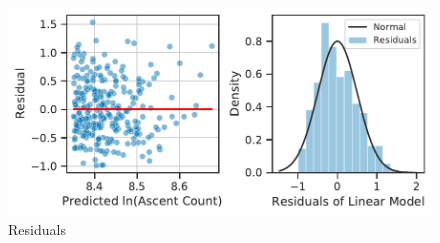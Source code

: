 \documentclass[11pt,a4paper]{article}
\begin{document}
\begin{figure} [h!]
  \centering
  \includegraphics{report/uni_residuals.pdf}
  \caption{Residuals}
  \label{fds-project-template:fig:uni_residuals}
\end{figure} \\ \\
\end{document}
